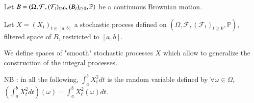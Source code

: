 

Let $B = (\Omega, \mathcal{F}, (\mathcal{F}_t)_{t \geq 0}, (B_t)_{t \geq 0}, \mathbb{P})$ be a continuous Brownian motion.

Let $X = (X_t)_{t \in [a,b]}$ a stochastic process defined on $(\Omega, \mathcal{F}, (\mathcal{F}_t)_{t \geq 0}, \mathbb{P})$, filtered space of $B$, restricted to $[a,b]$.

We define spaces of "smooth" stochastic processes $X$ which allow to generalize the construction of the integral processes.

NB : in all the following, $\int_a^b X_t^2 dt$ is the random variable defined by $\forall \omega \in \Omega$, $\left(\int_a^b X_t^2 dt\right) (\omega) = \int_a^b X_t^2(\omega) dt$.


